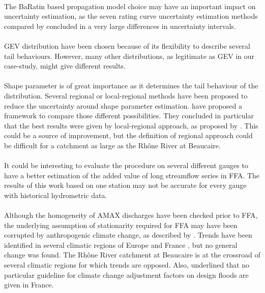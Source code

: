 \documentclass[11pt]{article}
\begin{document}
    \paragraph{}
    The BaRatin \citep{lecoz_quantification_2014} based propagation model choice may have an important impact on uncertainty estimation, as the seven rating curve uncertainty estimation methods compared by \citet{kiang_comparison_2018} concluded in a very large differences in uncertainty intervals.
    \paragraph{}
    GEV distribution have been chosen because of its flexibility to describe several tail behaviours. However, many other distributions, as legitimate as GEV in our case-study, might give different results. 
    \paragraph{}
    Shape parameter is of great importance as it determines the tail behaviour of the distribution. Several regional or local-regional methods have been proposed to reduce the uncertainty around shape parameter estimation. \citet{renard_data-based_2013} have proposed a framework to compare those different possibilities. They concluded in particular that the best results were given by local-regional approach, as proposed by \citet{ribatet_regional_2007}. This could be a source of improvement, but the definition of regional approach could be difficult for a catchment as large as the Rhône River at Beaucaire.
    \paragraph{}
    It could be interesting to evaluate the procedure on several different gauges to have a better estimation of the added value of long streamflow series in FFA. The results of this work based on one station may not be accurate for every gauge with historical hydrometric data.  
    \paragraph{}
    Although the homogeneity of AMAX discharges have been checked prior to FFA, the underlying assumption of stationarity required for FFA may have been corrupted by anthropogenic climate change, as described by \citet{milly_stationarity_2008}. Trends have been identified in several climatic regions of Europe \citep{hall_understanding_2014} and France \citep{renard_regional_2008}, but no general change was found. The Rhône River catchment at Beaucaire is at the crossroad of several climatic regions for which trends are opposed. Also, \citet{madsen_floodfreq_2013} underlined that no particular guideline for climate change adjustment factors on design floods are given in France.
\end{document}
